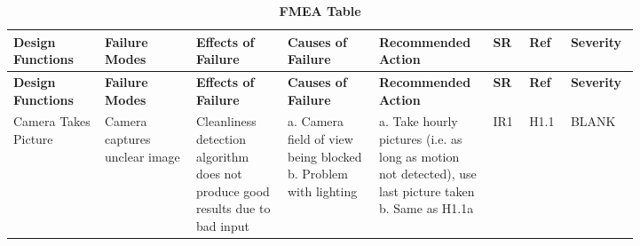 \documentclass{article}
\begin{document}
\begin{longtable}{|>{\raggedright\arraybackslash}p{0.13\linewidth} | >{\raggedright\arraybackslash}p{0.13\linewidth} | >{\raggedright\arraybackslash}p{0.13\linewidth}| >{\raggedright\arraybackslash}p{0.13\linewidth}| >{\raggedright\arraybackslash}p{0.13\linewidth}| >{\raggedright\arraybackslash}p{0.05\linewidth}| >{\raggedright\arraybackslash}p{0.05\linewidth}| >{\raggedright\arraybackslash}p{0.07\linewidth}|}
    \caption{\bf FMEA Table} \label{tab:my_label} \\
    
    \hline
    \textbf{Design Functions} & \textbf{Failure Modes} & \textbf{Effects of Failure} & \textbf{Causes of Failure} & \textbf{Recommended Action} & \textbf{SR} & \textbf{Ref} & \textbf{Severity}\\
    \hline
    \endfirsthead
    
    \hline
    \textbf{Design Functions} & \textbf{Failure Modes} & \textbf{Effects of Failure} & \textbf{Causes of Failure} & \textbf{Recommended Action} & \textbf{SR} & \textbf{Ref} & \textbf{Severity}\\
    \hline
    \endhead
    
    \hline
    \endfoot
    
    \hline
    \endlastfoot


    \hline
    Camera Takes Picture & Camera captures unclear image \newline & Cleanliness detection algorithm does not produce good results due to bad input\newline & a. Camera field of view being blocked \newline b. Problem with lighting  \newline & a. Take hourly pictures (i.e. as long as motion not detected), use last picture taken \newline b. Same as H1.1a  \newline & IR1  \newline & H1.1  \newline & BLANK\\
    

\end{longtable}
\end{document}
